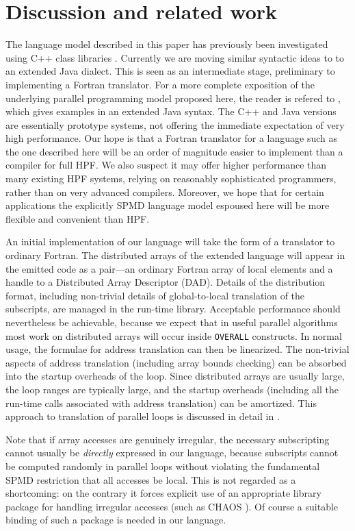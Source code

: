 \section{Discussion and related work}

The language model described in this paper has previously been
investigated using C++ class libraries \cite{AdPP}.
Currently we are moving similar syntactic ideas to to an extended
Java dialect.  This is seen as an intermediate stage, preliminary
to implementing a Fortran translator.
For a more complete exposition of the underlying parallel programming
model proposed here, the reader is refered to \cite{JavaAd}, which
gives examples in an extended Java syntax.
The C++ and Java versions are essentially prototype systems, not offering the
immediate expectation of very high performance.  Our hope is that
a Fortran translator for a language such as the one described here
will be an order of magnitude easier to implement than a compiler for full
HPF.  We also suspect it may offer higher performance than many
existing HPF systems, relying on reasonably sophisticated programmers,
rather than on very advanced compilers.  Moreover, we hope that for
certain applications the explicitly SPMD language model espoused here
will be more flexible and convenient than HPF.

An initial implementation of our language will take the form
of a translator to ordinary Fortran.
The distributed arrays of the extended language will appear in the
emitted code as a pair---an ordinary Fortran array of local elements and a
handle to a Distributed Array Descriptor (DAD).  Details of the distribution
format, including non-trivial details of global-to-local translation of
the subscripts, are managed in the run-time library.  Acceptable
performance should nevertheless be achievable, because we expect that in
useful parallel algorithms most work on distributed arrays
will occur inside {\tt OVERALL} constructs.  In normal usage,
the formulae for address translation can then be linearized.  The non-trivial
aspects of address translation (including array bounds checking) can be
absorbed into the startup overheads of the loop.  Since distributed
arrays are usually large, the loop ranges are typically large, and
the startup overheads (including all the run-time calls associated with
address translation) can be amortized.  This approach to translation of
parallel loops is discussed in detail in \cite{NPAC_PCRC_kernel}.

Note that if array accesses are genuinely irregular, the necessary
subscripting
cannot usually be {\em directly} expressed in our language, because
subscripts cannot be computed randomly in parallel loops without
violating the fundamental SPMD restriction that all accesses be local.
This is not regarded as a shortcoming: on the contrary it forces explicit
use of an appropriate library package for handling irregular accesses
(such as CHAOS \cite{CHAOS}).  Of course a suitable binding of such a
package is needed in our language.

